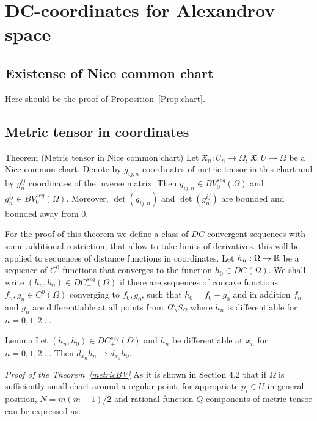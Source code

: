 \documentclass[a4paper,10pt]{article}
\begin{document}
 
\section{DC-coordinates for Alexandrov space}

\subsection{Existense of Nice common chart}\label{NiceChartProof}
Here should be the proof of 
Proposition~\ref{Prop:chart}.
\subsection{Metric tensor  in coordinates}\label{sec:metr-con}

\begin{thm}{Theorem (Metric tensor in Nice common chart)}\label{metricBV}
Let
$\mathfrak X_n:U_n\to\Omega$,
$\mathfrak X:U\to\Omega$ be a Nice common chart.
Denote by $g_{ij,n}$ coordinates of metric tensor in this chart
and by $g^{ij}_n$ coordinates of the inverse matrix. 
Then
$g_{ij,n}\in BV_0^{seq}(\Omega)$
and
$g^{ij}_n\in BV_0^{seq}(\Omega)$.
Moreover, $\det(g_{ij,n})$ and $\det(g^{ij}_n)$ are bounded and bounded away from 0.

\end{thm}




For the proof of this theorem we define a class of $DC$-convergent sequences with some additional restriction,
that allow to take limits of derivatives.
 this will be applied to sequences of distance functions
in coordinates.
Let $h_n:\Omega\to\mathbb{R}$ be a sequence of $C^0$ functions that
converges to the function $h_0\in DC(\Omega)$.
We shall write
$(h_n, h_0)\in DC_+^{seq}(\Omega)$
if
there are sequences of concave functions $f_n,g_n\in C^0(\Omega)$ converging to
$f_0,g_0$, such that 
$h_0=f_0-g_0$ and in addition $f_n$ and $g_n$
are  differentiable at all points
from $\Omega\setminus S_\Omega$ where $h_n$ is
differentiable for $n=0,1,2\dots$.

 
 
\begin{thm}{Lemma}\label{DC+}
	Let
$(h_n, h_0)\in DC_+^{seq}(\Omega)$
and $h_n$ be
differentiable at
$x_n$ for $n=0,1,2\dots$.
Then $d_{x_n}h_n\to d_{x_0}h_0$. 


\end{thm}

{\it Proof of the Theorem~\ref{metricBV} }
As it is shown in \cite{PerDC} Section 4.2
that if $\Omega$ is sufficiently small chart around a regular point,
for appropriate $p_i\in U$ in general position, $N=m(m+1)/2$ and rational function $Q$ components of metric tensor can be expressed as:
\end{document}

